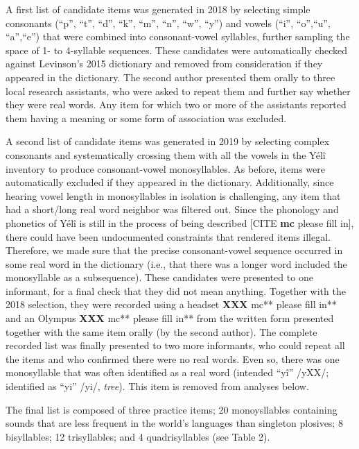 \documentclass[english,,man,floatsintext]{apa6}
\begin{document}
A first list of candidate items was generated in 2018 by selecting
simple consonants (\enquote{p}, \enquote{t}, \enquote{d}, \enquote{k},
\enquote{m}, \enquote{n}, \enquote{w}, \enquote{y}) and vowels
(\enquote{i}, \enquote{o},\enquote{u}, \enquote{a},\enquote{e}) that
were combined into consonant-vowel syllables, further sampling the space
of 1- to 4-syllable sequences. These candidates were automatically
checked against Levinson's 2015 dictionary and removed from
consideration if they appeared in the dictionary. The second author
presented them orally to three local research assistants, who were asked
to repeat them and further say whether they were real words. Any item
for which two or more of the assistants reported them having a meaning
or some form of association was excluded.

A second list of candidate items was generated in 2019 by selecting
complex consonants and systematically crossing them with all the vowels
in the Yélî inventory to produce consonant-vowel monosyllables. As
before, items were automatically excluded if they appeared in the
dictionary. Additionally, since hearing vowel length in monosyllables in
isolation is challenging, any item that had a short/long real word
neighbor was filtered out. Since the phonology and phonetics of Yélî is
still in the process of being described {[}CITE \textbf{mc} please fill
in{]}, there could have been undocumented constraints that rendered
items illegal. Therefore, we made sure that the precise consonant-vowel
sequence occurred in some real word in the dictionary (i.e., that there
was a longer word included the monosyllable as a subsequence). These
candidates were presented to one informant, for a final check that they
did not mean anything. Together with the 2018 selection, they were
recorded using a headset \textbf{XXX }mc** please fill in** and an
Olympus \textbf{XXX }mc** please fill in** from the written form
presented together with the same item orally (by the second author). The
complete recorded list was finally presented to two more informants, who
could repeat all the items and who confirmed there were no real words.
Even so, there was one monosyllable that was often identified as a real
word (intended \enquote{yî} /yXX/; identified as \enquote{yi} /yi/,
\emph{tree}). This item is removed from analyses below.

The final list is composed of three practice items; 20 monoysllables
containing sounds that are less frequent in the world's languages than
singleton plosives; 8 bisyllables; 12 trisyllables; and 4
quadrisyllables (see Table 2).
\end{document}
